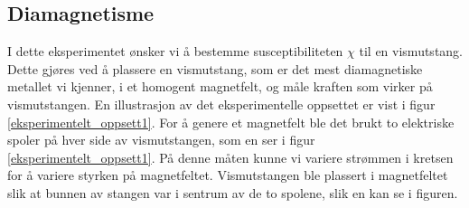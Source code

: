 \documentclass[%
 reprint,
 amsmath,amssymb,
 aps,
 norsk,
]{revtex4-1}
\begin{document}
\subsection{Diamagnetisme}
I dette eksperimentet ønsker vi å bestemme susceptibiliteten $\chi$ til en vismutstang. Dette gjøres ved å plassere en vismutstang, som er det mest diamagnetiske metallet vi kjenner, i et homogent magnetfelt, og måle kraften som virker på vismutstangen. En illustrasjon av det eksperimentelle oppsettet er vist i figur \vref{eksperimentelt_oppsett1}. For å genere et magnetfelt ble det brukt to elektriske spoler på hver side av vismutstangen, som en ser i figur \vref{eksperimentelt_oppsett1}. På denne måten kunne vi variere strømmen i kretsen for å variere styrken på magnetfeltet. Vismutstangen ble plassert i magnetfeltet slik at bunnen av stangen var i sentrum av de to spolene, slik en kan se i figuren.
\end{document}
